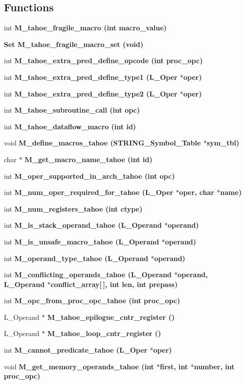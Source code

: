 \subsection*{Functions}
\begin{CompactItemize}
\item 
int \bf{M\_\-tahoe\_\-fragile\_\-macro} (int macro\_\-value)
\item 
\bf{Set} \bf{M\_\-tahoe\_\-fragile\_\-macro\_\-set} (void)
\item 
int \bf{M\_\-tahoe\_\-extra\_\-pred\_\-define\_\-opcode} (int proc\_\-opc)
\item 
int \bf{M\_\-tahoe\_\-extra\_\-pred\_\-define\_\-type1} (L\_\-Oper $\ast$oper)
\item 
int \bf{M\_\-tahoe\_\-extra\_\-pred\_\-define\_\-type2} (L\_\-Oper $\ast$oper)
\item 
int \bf{M\_\-tahoe\_\-subroutine\_\-call} (int opc)
\item 
int \bf{M\_\-tahoe\_\-dataflow\_\-macro} (int id)
\item 
void \bf{M\_\-define\_\-macros\_\-tahoe} (\bf{STRING\_\-Symbol\_\-Table} $\ast$sym\_\-tbl)
\item 
char $\ast$ \bf{M\_\-get\_\-macro\_\-name\_\-tahoe} (int id)
\item 
int \bf{M\_\-oper\_\-supported\_\-in\_\-arch\_\-tahoe} (int opc)
\item 
int \bf{M\_\-num\_\-oper\_\-required\_\-for\_\-tahoe} (L\_\-Oper $\ast$oper, char $\ast$\bf{name})
\item 
int \bf{M\_\-num\_\-registers\_\-tahoe} (int ctype)
\item 
int \bf{M\_\-is\_\-stack\_\-operand\_\-tahoe} (L\_\-Operand $\ast$operand)
\item 
int \bf{M\_\-is\_\-unsafe\_\-macro\_\-tahoe} (L\_\-Operand $\ast$operand)
\item 
int \bf{M\_\-operand\_\-type\_\-tahoe} (L\_\-Operand $\ast$operand)
\item 
int \bf{M\_\-conflicting\_\-operands\_\-tahoe} (L\_\-Operand $\ast$operand, L\_\-Operand $\ast$conflict\_\-array[$\,$], int len, int prepass)
\item 
int \bf{M\_\-opc\_\-from\_\-proc\_\-opc\_\-tahoe} (int proc\_\-opc)
\item 
L\_\-Operand $\ast$ \bf{M\_\-tahoe\_\-epilogue\_\-cntr\_\-register} ()
\item 
L\_\-Operand $\ast$ \bf{M\_\-tahoe\_\-loop\_\-cntr\_\-register} ()
\item 
int \bf{M\_\-cannot\_\-predicate\_\-tahoe} (L\_\-Oper $\ast$oper)
\item 
void \bf{M\_\-get\_\-memory\_\-operands\_\-tahoe} (int $\ast$first, int $\ast$number, int proc\_\-opc)
\end{CompactItemize}
